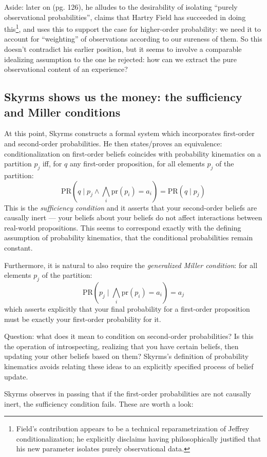 \documentclass[letterpaper,12pt]{article}
\begin{document}
Aside: later on (pg. 126), he alludes to the desirability of isolating ``purely observational probabilities'', claims that Hartry Field has succeeded in doing this\footnote{Field's contribution appears to be a technical reparametrization of Jeffrey conditionalization; he explicitly disclaims having philosophically justified that his new parameter isolates purely observational data.}, and uses this to support the case for higher-order probability: we need it to account for ``weighting'' of observations according to our sureness of them. So this doesn't contradict his earlier position, but it seems to involve a comparable idealizing assumption to the one he rejected: how can we extract the pure observational content of an experience?

\subsection{Skyrms shows us the money: the sufficiency and Miller conditions}
At this point, Skyrms constructs a formal system which incorporates first-order and second-order probabilities. He then states/proves an equivalence: conditionalization on first-order beliefs coincides with probability kinematics on a partition $p_j$ iff, for $q$ any first-order proposition, for all elements $p_j$ of the partition:
$$\text{PR}(q \mid p_j \land \bigwedge_i \text{pr}(p_i) = a_i) = \text{PR}(q \mid p_j)$$
This is the \emph{sufficiency condition} and it asserts that your second-order beliefs are causally inert --- your beliefs about your beliefs do not affect interactions between real-world propositions. This seems to correspond exactly with the defining assumption of probability kinematics, that the conditional probabilities remain constant.

Furthermore, it is natural to also require the \emph{generalized Miller condition}: for all elements $p_j$ of the partition:
$$\text{PR}(p_j \mid \bigwedge_i \text{pr}(p_i) = a_i) = a_j$$
which asserts explicitly that your final probability for a first-order proposition must be exactly your first-order probability for it.

Question: what does it mean to condition on second-order probabilities? Is this the operation of introspecting, realizing that you have certain beliefs, then updating your other beliefs based on them? Skyrms's definition of probability kinematics avoids relating these ideas to an explicitly specified process of belief update.

Skyrms observes in passing that if the first-order probabilities are not causally inert, the sufficiency condition fails. These are worth a look:
\end{document}
